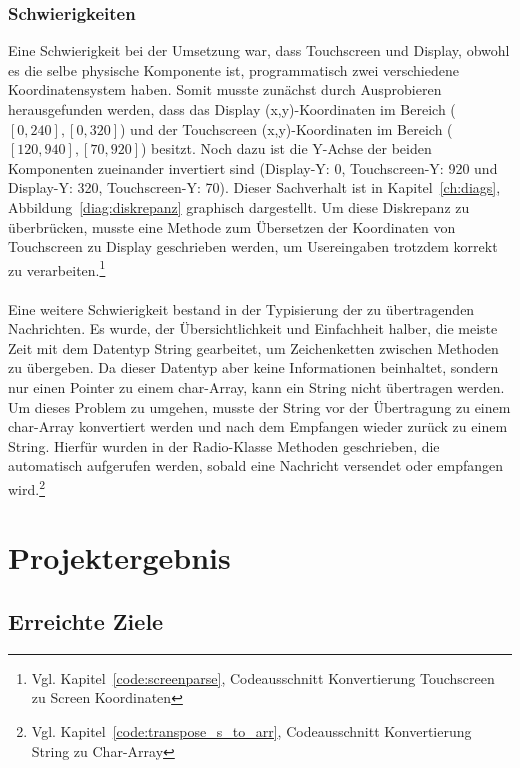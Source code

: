 \documentclass[a4paper, 11pt]{scrartcl}
\begin{document}
\subsubsection{Schwierigkeiten}\label{ch:hard_stuff}
Eine Schwierigkeit bei der Umsetzung war, dass Touchscreen und Display, obwohl es die selbe physische Komponente ist, programmatisch zwei 
verschiedene Koordinatensystem haben. Somit musste zunächst durch Ausprobieren herausgefunden werden, dass das Display (x,y)-Koordinaten im Bereich
($\left[\text{0},\text{240}\right],\left[\text{0},\text{320}\right]$) und der Touchscreen (x,y)-Koordinaten im Bereich 
($\left[\text{120},\text{940}\right],\left[\text{70},\text{920}\right]$) besitzt. Noch dazu ist die Y-Achse der beiden Komponenten zueinander invertiert sind
(Display-Y: 0, Touchscreen-Y: 920 und Display-Y: 320, Touchscreen-Y: 70). Dieser Sachverhalt ist in Kapitel~\ref{ch:diags}, Abbildung~\ref{diag:diskrepanz}
graphisch dargestellt. Um diese Diskrepanz zu überbrücken, musste eine Methode zum Übersetzen der Koordinaten von Touchscreen zu Display geschrieben werden, um 
Usereingaben trotzdem korrekt zu verarbeiten.\footnote{Vgl. Kapitel~\ref{code:screenparse}, Codeausschnitt \glqq Konvertierung Touchscreen zu Screen Koordinaten\grqq{}} 
\\
\\
Eine weitere Schwierigkeit bestand in der Typisierung der zu übertragenden Nachrichten. Es wurde, der Übersichtlichkeit und Einfachheit halber, die meiste Zeit mit
dem Datentyp String gearbeitet, um Zeichenketten zwischen Methoden zu übergeben. Da dieser Datentyp aber keine Informationen beinhaltet, sondern nur einen Pointer
zu einem char-Array, kann ein String nicht übertragen werden. Um dieses Problem zu umgehen, musste der String vor der Übertragung zu einem char-Array konvertiert
werden und nach dem Empfangen wieder zurück zu einem String. Hierfür wurden in der Radio-Klasse Methoden geschrieben, die automatisch aufgerufen werden, sobald
eine Nachricht versendet oder empfangen wird.\footnote{Vgl. Kapitel~\ref{code:transpose_s_to_arr}, Codeausschnitt \glqq Konvertierung String zu Char-Array\grqq{}}

\section{Projektergebnis}
\subsection{Erreichte Ziele}
\end{document}
